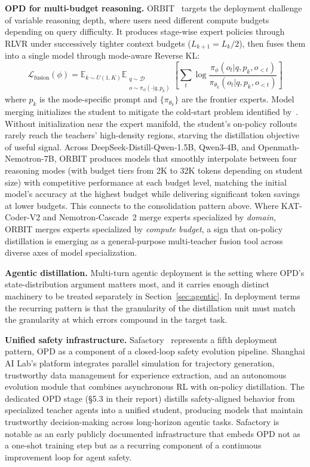 \documentclass{article} %
\newcommand{\E}{\mathbb{E}}
\newcommand{\loss}{\mathcal{L}}
\begin{document}
\textbf{OPD for multi-budget reasoning.} ORBIT~\citep{2601.08310} targets the deployment challenge of variable reasoning depth, where users need different compute budgets depending on query difficulty. It produces stage-wise expert policies through RLVR under successively tighter context budgets ($L_{k+1} = L_k/2$), then fuses them into a single model through mode-aware Reverse KL:
\begin{equation*}
    \loss_{\text{fusion}}(\phi) = \E_{k \sim U(1,K)} \E_{\substack{q \sim \mathcal{D} \\ o \sim \pi_\phi(\cdot|q, p_k)}} \left[ \sum_t \log \frac{\pi_\phi(o_t | q, p_k, o_{<t})}{\pi_{\theta_k}(o_t | q, p_k, o_{<t})} \right]
\end{equation*}
where $p_k$ is the mode-specific prompt and $\{\pi_{\theta_k}\}$ are the frontier experts. Model merging initializes the student to mitigate the cold-start problem identified by~\citet{2601.07155}. Without initialization near the expert manifold, the student's on-policy rollouts rarely reach the teachers' high-density regions, starving the distillation objective of useful signal. Across DeepSeek-Distill-Qwen-1.5B, Qwen3-4B, and Openmath-Nemotron-7B, ORBIT produces models that smoothly interpolate between four reasoning modes (with budget tiers from 2K to 32K tokens depending on student size) with competitive performance at each budget level, matching the initial model's accuracy at the highest budget while delivering significant token savings at lower budgets. This connects to the consolidation pattern above. Where KAT-Coder-V2 and Nemotron-Cascade~2 merge experts specialized by \emph{domain}, ORBIT merges experts specialized by \emph{compute budget}, a sign that on-policy distillation is emerging as a general-purpose multi-teacher fusion tool across diverse axes of model specialization.

\textbf{Agentic distillation.} Multi-turn agentic deployment is the setting where OPD's state-distribution argument matters most, and it carries enough distinct machinery to be treated separately in Section~\ref{sec:agentic}. In deployment terms the recurring pattern is that the granularity of the distillation unit must match the granularity at which errors compound in the target task.

\textbf{Unified safety infrastructure.} Safactory~\citep{2605.06230} represents a fifth deployment pattern, OPD as a component of a closed-loop safety evolution pipeline. Shanghai AI Lab's platform integrates parallel simulation for trajectory generation, trustworthy data management for experience extraction, and an autonomous evolution module that combines asynchronous RL with on-policy distillation. The dedicated OPD stage (\S5.3 in their report) distills safety-aligned behavior from specialized teacher agents into a unified student, producing models that maintain trustworthy decision-making across long-horizon agentic tasks. Safactory is notable as an early publicly documented infrastructure that embeds OPD not as a one-shot training step but as a recurring component of a continuous improvement loop for agent safety.
\end{document}
